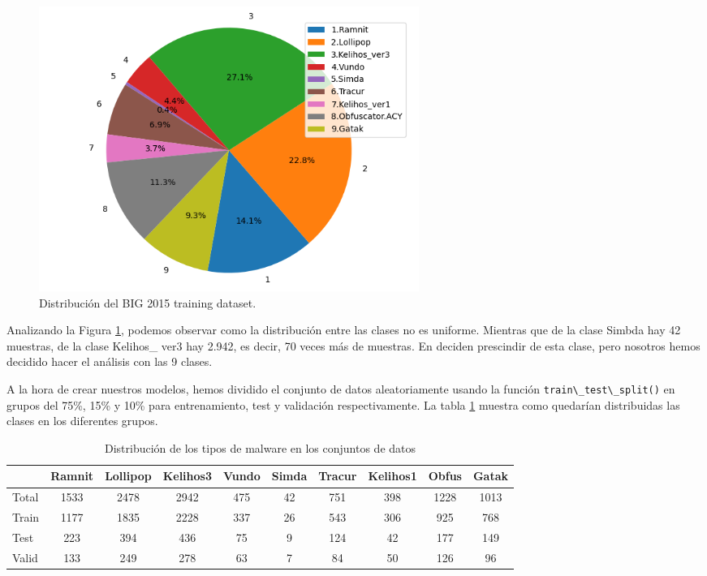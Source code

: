 \begin{figure}[h]
    \begin{center}
    \includegraphics[width=0.6\textwidth]{img/circularMMC.png}
    \end{center}
    \caption{Distribución del BIG 2015 training dataset.}
    \label{img: circularMMC}
\end{figure}  

Analizando la Figura \ref{img: circularMMC}, podemos observar como la distribución entre las clases no es uniforme. Mientras que de la clase Simbda hay 42 muestras, de la clase Kelihos\_ ver3 hay 2.942, es decir, 70 veces más de muestras. En \citep{kebede2017classification} deciden prescindir de esta clase, pero nosotros hemos decidido hacer el análisis con las 9 clases. 


A la hora de crear nuestros modelos, hemos dividido el conjunto de datos aleatoriamente usando la función \lstinline|train\_test\_split()| en grupos del 75\%, 15\% y 10\% para entrenamiento, test y validación respectivamente. La tabla \ref{tab:malware_distribution} muestra como quedarían distribuidas las clases en los diferentes grupos.

\begin{table}[h]
\centering
\begin{tabular}{lccccccccc}
\hline
& Ramnit & Lollipop & Kelihos3 & Vundo & Simda & Tracur & Kelihos1 & Obfus & Gatak \\
\hline
Total & 1533 & 2478 & 2942 & 475 & 42 & 751 & 398 & 1228 & 1013 \\
Train & 1177 & 1835 & 2228 & 337 & 26 & 543 & 306 & 925 & 768 \\
Test & 223 & 394 & 436 & 75 & 9 & 124 & 42 & 177 & 149 \\
Valid & 133 & 249 & 278 & 63 & 7 & 84 & 50 & 126 & 96 \\
\hline
\end{tabular}
\caption{Distribución de los tipos de malware en los conjuntos de datos}
\label{tab:malware_distribution}
\end{table}

